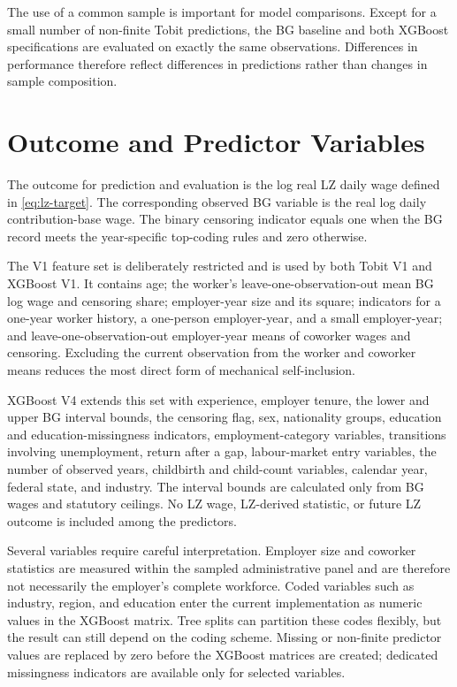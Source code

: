\documentclass[12pt,a4paper,oneside,titlepage]{book}
\begin{document}
The use of a common sample is important for model comparisons. Except for a small number of non-finite Tobit predictions, the BG baseline and both XGBoost specifications are evaluated on exactly the same observations. Differences in performance therefore reflect differences in predictions rather than changes in sample composition.

\section{Outcome and Predictor Variables}
The outcome for prediction and evaluation is the log real LZ daily wage defined in \cref{eq:lz-target}. The corresponding observed BG variable is the real log daily contribution-base wage. The binary censoring indicator equals one when the BG record meets the year-specific top-coding rules and zero otherwise.

The V1 feature set is deliberately restricted and is used by both Tobit V1 and XGBoost V1. It contains age; the worker's leave-one-observation-out mean BG log wage and censoring share; employer-year size and its square; indicators for a one-year worker history, a one-person employer-year, and a small employer-year; and leave-one-observation-out employer-year means of coworker wages and censoring. Excluding the current observation from the worker and coworker means reduces the most direct form of mechanical self-inclusion.

XGBoost V4 extends this set with experience, employer tenure, the lower and upper BG interval bounds, the censoring flag, sex, nationality groups, education and education-missingness indicators, employment-category variables, transitions involving unemployment, return after a gap, labour-market entry variables, the number of observed years, childbirth and child-count variables, calendar year, federal state, and industry. The interval bounds are calculated only from BG wages and statutory ceilings. No LZ wage, LZ-derived statistic, or future LZ outcome is included among the predictors.

Several variables require careful interpretation. Employer size and coworker statistics are measured within the sampled administrative panel and are therefore not necessarily the employer's complete workforce. Coded variables such as industry, region, and education enter the current implementation as numeric values in the XGBoost matrix. Tree splits can partition these codes flexibly, but the result can still depend on the coding scheme. Missing or non-finite predictor values are replaced by zero before the XGBoost matrices are created; dedicated missingness indicators are available only for selected variables.
\end{document}
